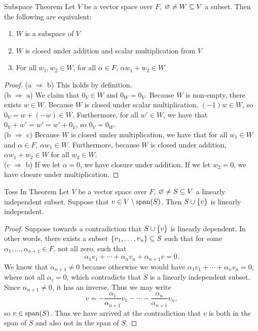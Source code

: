\documentclass[class=article, crop=false]{standalone}
\begin{document}
  \begin{theorem}{Subspace Theorem}
    Let $V$ be a vector space over $F$, $\varnothing\neq W\subseteq V$ a subset. Then the following are equivalent:
    \begin{enumerate}[label=(\alph*)]
      \item $W$ is a subspace of $V$
      \item $W$ is closed under addition and scalar multiplication from $V$
      \item For all $w_1,w_2\in W$, for all $\alpha\in F$, $\alpha w_1+w_2\in W$
    \end{enumerate}
  \end{theorem}
  \begin{proof}
    (a $\Rightarrow$ b) This holds by definition. \\[10pt]
    (b $\Rightarrow$ a) We claim that $0_V\in W$ and $0_W = 0_V$. Because $W$ is non-empty, there exists $w\in W$. Because $W$ is closed under scalar multiplication, $(-1)w\in W$, so $0_V = w + (-w) \in W$. Furthermore, for all $w'\in W$, we have that $0_V + w' = w' = w' + 0_V$, so $0_V = 0_W$. \\[10pt]
    (b $\Rightarrow$ c) Because $W$ is closed under multiplication, we have that for all $w_1\in W$ and $\alpha\in F$, $\alpha w_1\in W$. Furthermore, because $W$ is closed under addition, $\alpha w_1 + w_2\in W$ for all $w_2\in W$. \\[10pt]
    (c $\Rightarrow$ b) If we let $\alpha = 0$, we have closure under addition. If we let $w_2 = 0$, we have closure under multiplication.
  \end{proof}
  \newpage
  \begin{theorem}{Toss In Theorem}
    Let $V$ be a vector space over $F$, $\varnothing\neq S\subseteq V$ a linearly independent subset. Suppose that $v\in V\setminus \operatorname{span}(S)$. Then $S\cup \left\{v\right\}$ is linearly independent.
  \end{theorem}
  \begin{proof}
    Suppose towards a contradiction that $S\cup \left\{v\right\}$ is linearly dependent. In other words, there exists a subset $\left\{v_1,\dotsc,v_n\right\}\subseteq S$ such that for some $\alpha_1,\dotsc,\alpha_{n+1}\in F$, not all zero, such that
    \[
      \alpha_1v_1 + \dotsb + \alpha_nv_n + \alpha_{n+1}v = 0.
    \]
    We know that $\alpha_{n+1}\neq 0$ because otherwise we would have $\alpha_1v_1 + \dotsb + \alpha_nv_n = 0$, where not all $\alpha_i = 0$, which contradicts that $S$ is a linearly independent subset. Since $\alpha_{n+1} \neq 0$, it has an inverse. Thus we may write
    \[
      v = -\frac{\alpha_1}{\alpha_{n+1}}v_1 - \dotsb - \frac{\alpha_n}{\alpha_{n+1}}v_n,
    \]
    so $v\in \operatorname{span}(S)$. Thus we have arrived at the contradiction that $v$ is both in the span of $S$ and also not in the span of $S$.
  \end{proof}
\end{document}
